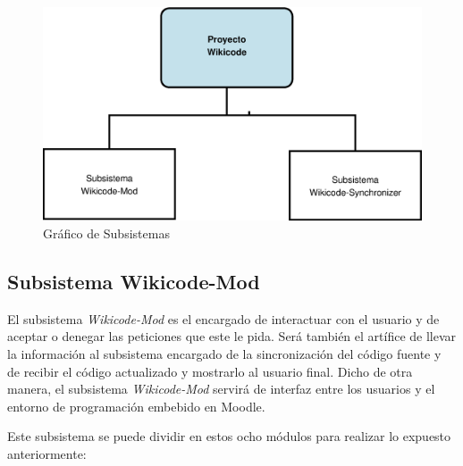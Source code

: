 \begin{figure}[h]
	\includegraphics[width=\textwidth]{./img/c3-subsistemas.eps}
	\caption{Gráfico de Subsistemas}
\end{figure}

\subsection{Subsistema Wikicode-Mod}

El subsistema \emph{Wikicode-Mod} es el encargado de interactuar con el usuario y de aceptar o denegar las peticiones que este le pida. Será también el artífice de llevar la información al subsistema encargado de la sincronización del código fuente y de recibir el código actualizado y mostrarlo al usuario final. Dicho de otra manera, el subsistema \emph{Wikicode-Mod} servirá de interfaz entre los usuarios y el entorno de programación embebido en Moodle.

Este subsistema se puede dividir en estos ocho módulos para realizar lo expuesto anteriormente:

